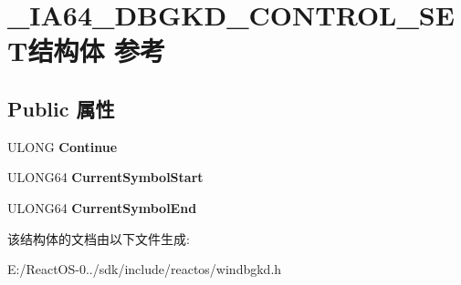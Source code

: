 \hypertarget{struct___i_a64___d_b_g_k_d___c_o_n_t_r_o_l___s_e_t}{}\section{\+\_\+\+I\+A64\+\_\+\+D\+B\+G\+K\+D\+\_\+\+C\+O\+N\+T\+R\+O\+L\+\_\+\+S\+E\+T结构体 参考}
\label{struct___i_a64___d_b_g_k_d___c_o_n_t_r_o_l___s_e_t}
\subsection*{Public 属性}
\begin{DoxyCompactItemize}
\item 
\mbox{\label{struct___i_a64___d_b_g_k_d___c_o_n_t_r_o_l___s_e_t_aaf976bd3a9582f1f5459f4fefb97d4af}} 
U\+L\+O\+NG {\bfseries Continue}
\item 
\mbox{\label{struct___i_a64___d_b_g_k_d___c_o_n_t_r_o_l___s_e_t_ae9936988058e3ef2e5c25ccb2091677f}} 
U\+L\+O\+N\+G64 {\bfseries Current\+Symbol\+Start}
\item 
\mbox{\label{struct___i_a64___d_b_g_k_d___c_o_n_t_r_o_l___s_e_t_a64503f3397440d82d4dcd7d7421b59b2}} 
U\+L\+O\+N\+G64 {\bfseries Current\+Symbol\+End}
\end{DoxyCompactItemize}


该结构体的文档由以下文件生成\+:\begin{DoxyCompactItemize}
\item 
E\+:/\+React\+O\+S-\/0../sdk/include/reactos/windbgkd.\+h\end{DoxyCompactItemize}

